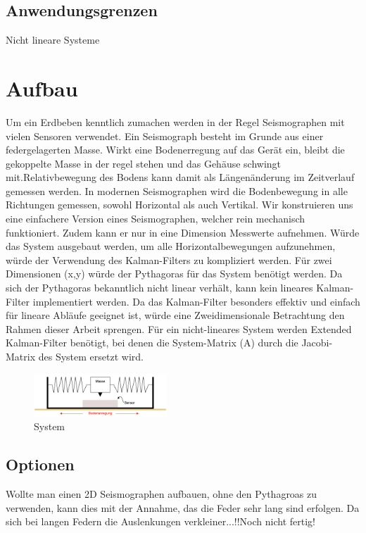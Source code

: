 \subsection{Anwendungsgrenzen}
Nicht lineare Systeme %


\section{Aufbau}
Um ein Erdbeben kenntlich zumachen werden in der Regel Seismographen mit vielen Sensoren verwendet. 
Ein Seismograph besteht im Grunde aus einer federgelagerten Masse. Wirkt eine Bodenerregung auf das Gerät ein, bleibt die gekoppelte Masse in der regel stehen und das Gehäuse schwingt mit.Relativbewegung des Bodens kann damit als Längenänderung im Zeitverlauf gemessen werden. In modernen Seismographen wird die Bodenbewegung in alle Richtungen gemessen, sowohl Horizontal als auch Vertikal. 
Wir konstruieren uns eine einfachere Version eines Seismographen, welcher rein mechanisch funktioniert. Zudem kann er nur in eine Dimension Messwerte aufnehmen. Würde das System ausgebaut werden, um alle Horizontalbewegungen aufzunehmen, würde der Verwendung des Kalman-Filters zu kompliziert werden. Für zwei Dimensionen (x,y) würde der Pythagoras für das System benötigt werden. Da sich der Pythagoras bekanntlich nicht linear verhält, kann kein lineares Kalman-Filter implementiert werden. Da das Kalman-Filter besonders effektiv und einfach für lineare Abläufe geeignet ist, würde eine Zweidimensionale Betrachtung den Rahmen dieser Arbeit sprengen. Für ein nicht-lineares System werden Extended Kalman-Filter benötigt, bei denen die System-Matrix (A) durch die Jacobi-Matrix des System ersetzt wird.

\begin{figure}
 \begin{center}
 \includegraphics[width=5cm]{papers/erdbeben/Apperatur}
 \caption{System}
 \end{center}
\end{figure}


\subsection{Optionen}
Wollte man einen 2D Seismographen aufbauen, ohne den Pythagroas zu verwenden, kann dies mit der Annahme, das die Feder sehr lang sind erfolgen. Da sich bei langen Federn die Auslenkungen verkleiner...!!Noch nicht fertig!

